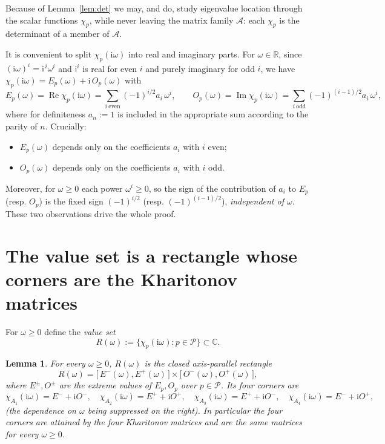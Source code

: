 \documentclass[12pt]{article}
\newtheorem{lemma}{Lemma}
\theoremstyle{definition}
\DeclareMathOperator{\Real}{Re}
\DeclareMathOperator{\Imag}{Im}
\newcommand{\jj}{\mathrm{i}}
\begin{document}
Because of Lemma~\ref{lem:det} we may, and do, study eigenvalue location through the
scalar functions $\chi_p$, while never leaving the matrix family $\mathcal A$: each
$\chi_p$ is the determinant of a member of $\mathcal A$.

\medskip

It is convenient to split $\chi_p(\jj\omega)$ into real and imaginary parts. For
$\omega\in\mathbb R$, since $(\jj\omega)^i=\jj^{\,i}\omega^i$ and $\jj^i$ is real for even
$i$ and purely imaginary for odd $i$, we have $\chi_p(\jj\omega)=E_p(\omega)+\jj\,O_p(\omega)$
with
\begin{equation}\label{eq:EO}
E_p(\omega)=\Real\chi_p(\jj\omega)=\sum_{i\ \mathrm{even}}(-1)^{i/2}a_i\,\omega^i,\qquad
O_p(\omega)=\Imag\chi_p(\jj\omega)=\sum_{i\ \mathrm{odd}}(-1)^{(i-1)/2}a_i\,\omega^i,
\end{equation}
where for definiteness $a_n:=1$ is included in the appropriate sum according to the
parity of $n$. Crucially:
\begin{itemize}
\item $E_p(\omega)$ depends only on the coefficients $a_i$ with $i$ even;
\item $O_p(\omega)$ depends only on the coefficients $a_i$ with $i$ odd.
\end{itemize}
Moreover, for $\omega\ge0$ each power $\omega^i\ge 0$, so the sign of the contribution of
$a_i$ to $E_p$ (resp. $O_p$) is the fixed sign $(-1)^{i/2}$ (resp. $(-1)^{(i-1)/2}$),
\emph{independent of $\omega$}. These two observations drive the whole proof.

\section{The value set is a rectangle whose corners are the Kharitonov matrices}

For $\omega\ge0$ define the \emph{value set}
\[
R(\omega):=\{\chi_p(\jj\omega):p\in\mathcal P\}\subset\mathbb C .
\]

\begin{lemma}\label{lem:rect}
For every $\omega\ge0$, $R(\omega)$ is the closed axis-parallel rectangle
\[
R(\omega)=\bigl[\,E^-(\omega),E^+(\omega)\,\bigr]\times\bigl[\,O^-(\omega),O^+(\omega)\,\bigr],
\]
where $E^\pm,O^\pm$ are the extreme values of $E_p,O_p$ over $p\in\mathcal P$. Its four
corners are
\[
\chi_{A_1}(\jj\omega)=E^-+\jj O^-,\quad
\chi_{A_2}(\jj\omega)=E^++\jj O^+,\quad
\chi_{A_3}(\jj\omega)=E^++\jj O^-,\quad
\chi_{A_4}(\jj\omega)=E^-+\jj O^+,
\]
(the dependence on $\omega$ being suppressed on the right). In particular the four
corners are attained by the four Kharitonov matrices and are the same matrices for every
$\omega\ge0$.
\end{lemma}
\end{document}
